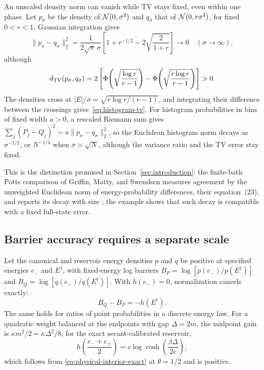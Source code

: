 An unscaled density norm can vanish while TV stays fixed, even within
one phase. Let $p_\sigma$ be the density of $\mathcal N(0,\sigma^2)$
and $q_\sigma$ that of $\mathcal N(0,r\sigma^2)$, for fixed $0<r<1$.
Gaussian integration gives
\begin{equation}
 \|p_\sigma-q_\sigma\|_2^2
 =\frac1{2\sqrt\pi\,\sigma}
 \left[1+r^{-1/2}-2\sqrt{\frac2{1+r}}\right]\longrightarrow0
 \quad(\sigma\to\infty),
 \label{eq:histogram-l2}
\end{equation}
although
\begin{equation}
 d_{\mathrm{TV}}(p_\sigma,q_\sigma)
 =2\left[
 \Phi\!\left(\sqrt{\frac{\log r}{r-1}}\right)
 -\Phi\!\left(\sqrt{\frac{r\log r}{r-1}}\right)\right]>0.
 \label{eq:histogram-tv}
\end{equation}
The densities cross at $|E|/\sigma=\sqrt{r\log r/(r-1)}$, and
integrating their difference between the crossings
gives~\eqref{eq:histogram-tv}. For histogram probabilities in bins of
fixed width $a>0$, a rescaled Riemann sum gives
$\sum_j(P_j-Q_j)^2\sim a\|p_\sigma-q_\sigma\|_2^2$, so the Euclidean
histogram norm decays as $\sigma^{-1/2}$, or $N^{-1/4}$ when
$\sigma\asymp\sqrt N$, although the variance ratio and the TV error
stay fixed.

This is the distinction promised in Section~\ref{sec:introduction}:
the finite-bath Potts comparison of Griffin, Matty, and Swendsen
measures agreement by the unweighted Euclidean norm of
energy-probability differences, their equation~(23), and reports its
decay with size \cite{GriffinMattySwendsen2017}; the example shows
that such decay is compatible with a fixed full-state error.

\subsection{Barrier accuracy requires a separate scale}

Let the canonical and reservoir energy densities $p$ and $q$ be
positive at specified energies $e_-$ and $E^\dagger$, with
fixed-energy log barriers $B_P=\log[p(e_-)/p(E^\dagger)]$ and
$B_Q=\log[q(e_-)/q(E^\dagger)]$.
With $h(e_-)=0$, normalization cancels exactly:
\begin{equation}
 B_Q-B_P=-h(E^\dagger).
 \label{eq:fixed-barrier-shift}
\end{equation}
The same holds for ratios of point probabilities in a discrete
energy law. For a quadratic weight balanced at the endpoints with gap
$\Delta=2m$, the midpoint gain is $\kappa m^2/2=\kappa\Delta^2/8$; for
the exact secant-calibrated reservoir,
\begin{equation}
 h\!\left(\frac{e_-+e_+}{2}\right)
 =c\log\cosh\!\left(\frac{\beta\Delta}{2c}\right),
 \label{eq:physical-exact-barrier}
\end{equation}
which follows from \eqref{eq:physical-interior-exact} at
$\theta=1/2$ and is positive.

